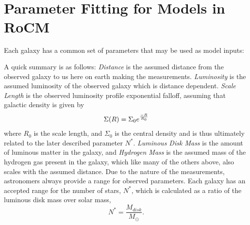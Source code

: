 \documentclass[conference]{IEEEtran-modified}
\begin{document}
\section{Parameter Fitting for Models in RoCM}
Each galaxy has a common set of parameters that may be used as model inputs: 
\begin{table}[h]
	\centering
	\normalsize
\end{table}

A quick summary is as follows: \emph{Distance} is the assumed distance from the observed galaxy to us here on earth making the measurements.  \emph{Luminosity} is the assumed luminosity of the observed galaxy which is distance dependent.  \emph{Scale Length} is the observed luminosity profile exponential falloff, assuming that galactic density is given by 
\begin{equation}
\Sigma(R)=\Sigma_0e^{\frac{-R}{R_0}}\\
\end{equation}
where {$R_0$} is the scale length, and {$\Sigma_0$} is the central density and is thus ultimately related to the later described parameter {$N^*$}.  \emph{Luminous Disk Mass} is the amount of luminous matter in the galaxy, and \emph{Hydrogen Mass} is the assumed mass of the hydrogen gas present in the galaxy, which like many of the others above, also scales with the assumed distance.
Due to the nature of the measurements, astronomers always provide a range for observed parameters. Each galaxy has an accepted range for the number of stars, $N^*$, which is calculated as a ratio of the luminous disk mass over solar mass,
\begin{equation}
N^* = \frac{M_{disk}}{M_{\odot}}.
\end{equation}
\end{document}
